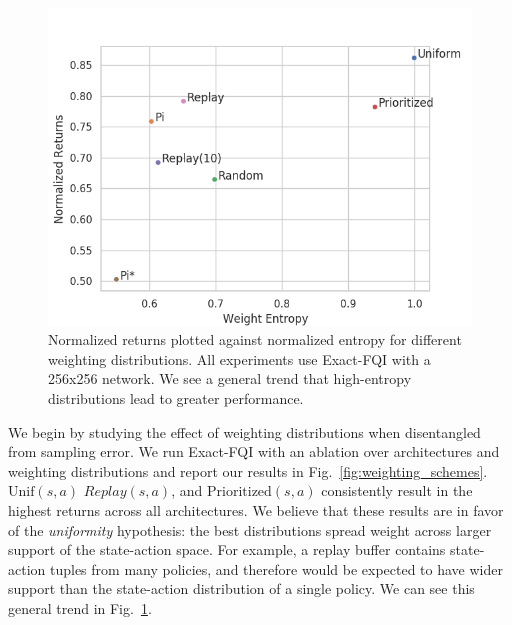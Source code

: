 \begin{figure}[ttt!]
\begin{minipage}[t]{0.32\linewidth}
\vspace{-0.3in}
\end{minipage}
~\vline~
\begin{minipage}[t]{0.32\linewidth}
\caption{\label{fig:weighting_entropy_vs_returns} Normalized returns plotted against normalized entropy for different weighting distributions. All experiments use Exact-FQI with a 256x256 network. We see a general trend that high-entropy distributions lead to greater performance.}
\includegraphics[width=0.99\columnwidth]{chapters/diagnosing_q/images/returns_vs_entropy}
\end{minipage}
\end{figure}


We begin by studying the effect of weighting distributions when disentangled from sampling error. We run Exact-FQI with an ablation over architectures and weighting distributions and report our results in Fig.~\ref{fig:weighting_schemes}. $\text{Unif}(s,a)$ $Replay(s,a)$, and $\text{Prioritized}(s,a)$ consistently result in the highest returns across all architectures.
We believe that these results are in favor of the \textit{uniformity} hypothesis: the best distributions spread weight across larger support of the state-action space. For example, a replay buffer contains state-action tuples from many policies, and therefore would be expected to have wider support than the state-action distribution of a single policy. We can see this general trend in Fig.~\ref{fig:weighting_entropy_vs_returns}. 

